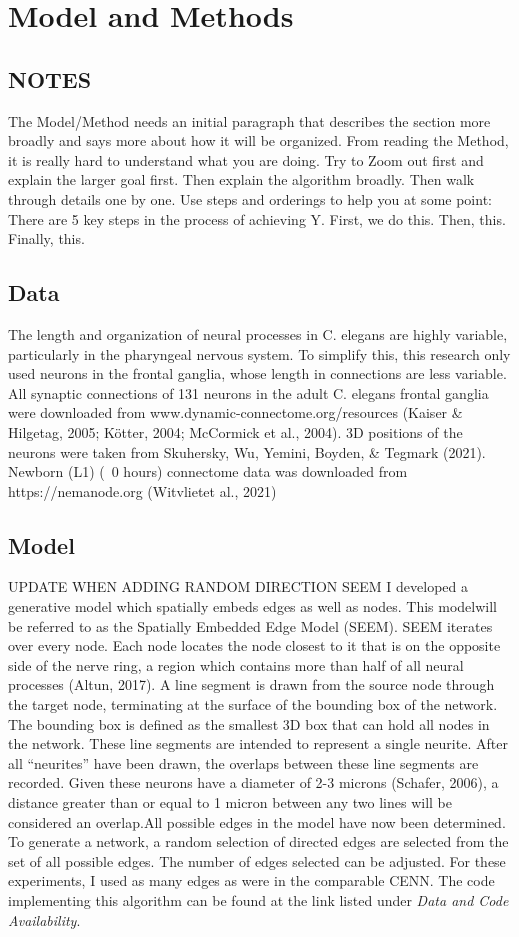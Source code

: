 \section{Model and Methods}
\subsection{NOTES}

The Model/Method needs an initial paragraph that describes the section more broadly and says more about how it will be organized. From reading the Method, it is really hard to understand what you are doing. Try to Zoom out first and explain the larger goal first. Then explain the algorithm broadly. Then walk through details one by one. Use steps and orderings to help you at some point: There are 5 key steps in the process of achieving Y. First, we do this. Then, this. Finally, this.

\subsection{Data}
The length and organization of neural processes in C. elegans are highly variable, particularly in the pharyngeal nervous system. To simplify this, this research only used neurons in the frontal ganglia, whose length in connections are less variable. All synaptic connections of 131 neurons in the adult C. elegans frontal ganglia were downloaded from www.dynamic-connectome.org/resources (Kaiser \& Hilgetag, 2005; Kötter, 2004; McCormick et al., 2004). 3D positions of the neurons were taken from Skuhersky, Wu, Yemini, Boyden, \& Tegmark (2021). Newborn (L1) (~0 hours) connectome data was downloaded from https://nemanode.org (Witvlietet al., 2021)
\subsection{Model}
UPDATE WHEN ADDING RANDOM DIRECTION SEEM I developed a generative model which spatially embeds edges as well as nodes. This modelwill be referred to as the Spatially Embedded Edge Model (SEEM). SEEM iterates over every node. Each node locates the node closest to it that is on the opposite side of the nerve ring, a region which contains more than half of all neural processes (Altun, 2017). A line segment is drawn from the source node through the target node, terminating at the surface of the bounding box of the network. The bounding box is defined as the smallest 3D box that can hold all nodes in the network. These line segments are intended to represent a single neurite. After all “neurites” have been drawn, the overlaps between these line segments are recorded. Given these neurons have a diameter of 2-3 microns (Schafer, 2006), a distance greater than or equal to 1 micron between any two lines will be considered an overlap.All possible edges in the model have now been determined. To generate a network, a random selection of directed edges are selected from the set of all possible edges. The number of edges selected can be adjusted. For these experiments, I used as many edges as were in the comparable CENN. The code implementing this algorithm can be found at the link listed under \textit{Data and Code Availability}.
